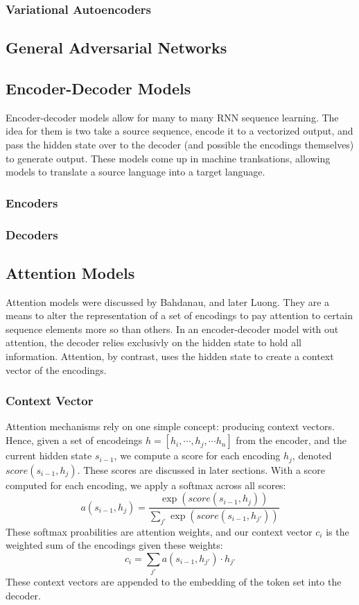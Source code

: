 \documentclass[twoside,twocolumn]{article}
\begin{document}
\subsubsection{Variational Autoencoders}
\subsection{General Adversarial Networks}
\subsection{Encoder-Decoder Models}
Encoder-decoder models allow for many to many RNN sequence learning. The idea
for them is two take a source sequence, encode it to a vectorized output, and
pass the hidden state over to the decoder (and possible the encodings themselves)
to generate output. These models come up in machine tranlsations, allowing
models to translate a source language into a target language.
\subsubsection{Encoders}
\subsubsection{Decoders}
\subsection{Attention Models}
Attention models were discussed by Bahdanau, and later Luong. They are a means
to alter the representation of a set of encodings to pay attention to certain
sequence elements more so than others. In an encoder-decoder model with out
attention, the decoder relies exclusivly on the hidden state to hold all
information. Attention, by contrast, uses the hidden state to create a context
vector of the encodings.
\subsubsection{Context Vector}
Attention mechanisms rely on one simple concept: producing context vectors.
Hence, given a set of encodeings $h = \left[h_i, \cdots, h_j, \cdots h_n \right]$
from the encoder, and the current hidden state $s_{i-1}$, we compute a score
for each encoding $h_j$, denoted $score(s_{i-1}, h_j)$. These scores are discussed
in later sections. With a score computed for each encoding, we apply a softmax
across all scores:
\begin{equation}
  a(s_{i-1}, h_j) = \frac{\exp(score(s_{i-1}, h_j))}{\sum_{j'} \exp(score(s_{i-1}, h_{j'}))}
\end{equation}
These softmax proabilities are attention weights, and our context vector $c_i$
is the weighted sum of the encodings given these weights:
\begin{equation}
  c_i = \sum_{j'} a(s_{i-1}, h_{j'}) \cdot h_{j'}
\end{equation}
These context vectors are appended to the embedding of the token set into the decoder.
\end{document}
